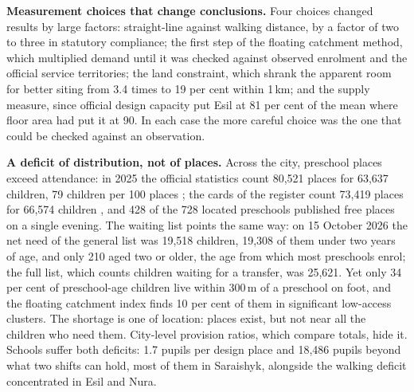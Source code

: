 \textbf{Measurement choices that change conclusions.} Four choices changed results by large factors: straight-line against walking distance, by a factor of two to three in statutory compliance; the first step of the floating catchment method, which multiplied demand until it was checked against observed enrolment and the official service territories; the land constraint, which shrank the apparent room for better siting from 3.4 times to 19 per cent within 1\,km; and the supply measure, since official design capacity put Esil at 81 per cent of the mean where floor area had put it at 90. In each case the more careful choice was the one that could be checked against an observation.

\textbf{A deficit of distribution, not of places.} Across the city, preschool places exceed attendance: in 2025 the official statistics count 80,521 places for 63,637 children, 79 children per 100 places \cite{stateducation2026}; the cards of the register count 73,419 places for 66,574 children \cite{indigocards2026}, and 428 of the 728 located preschools published free places on a single evening. The waiting list points the same way: on 15 October 2026 the net need of the general list was 19,518 children, 19,308 of them under two years of age, and only 210 aged two or older, the age from which most preschools enrol; the full list, which counts children waiting for a transfer, was 25,621. Yet only 34 per cent of preschool-age children live within 300\,m of a preschool on foot, and the floating catchment index finds 10 per cent of them in significant low-access clusters. The shortage is one of location: places exist, but not near all the children who need them. City-level provision ratios, which compare totals, hide it. Schools suffer both deficits: 1.7 pupils per design place and 18,486 pupils beyond what two shifts can hold, most of them in Saraishyk, alongside the walking deficit concentrated in Esil and Nura.


